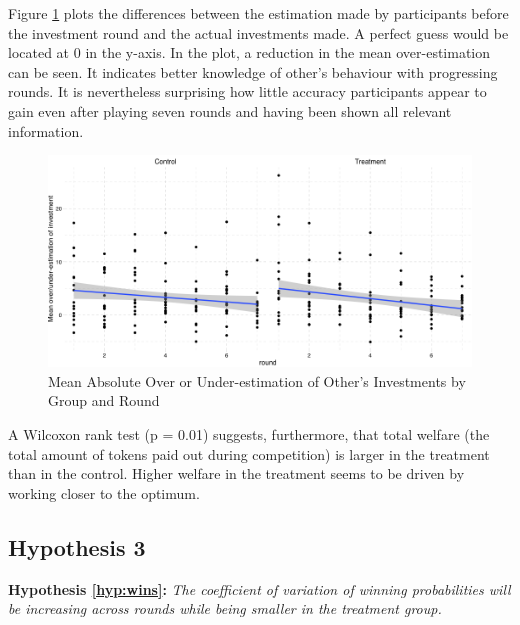 Figure \ref{fig:beliefs_smooth} plots the differences between the estimation made by participants before the investment round and the actual investments  made. A perfect guess would be located at 0 in the y-axis. In the plot, a reduction in the mean over-estimation can be seen. It indicates better knowledge of other's behaviour with progressing rounds. It is nevertheless surprising how little accuracy participants appear to gain even after playing seven rounds and having been shown all relevant information.\\

\begin{figure}
    \centering
    \includegraphics[width=\textwidth]{graphs/beliefs_smooth_lm.png}
    \caption{Mean Absolute Over or Under-estimation of Other's Investments by Group and Round}
    \label{fig:beliefs_smooth}
\end{figure}

A Wilcoxon rank test (p = 0.01) suggests, furthermore, that total welfare (the total amount of tokens paid out during competition) is larger in the treatment than in the control. Higher welfare in the treatment seems to be driven by working closer to the optimum.\\ 

\subsection{Hypothesis 3}

\textbf{Hypothesis \ref{hyp:wins}:} \textit{The coefficient of variation of winning probabilities will be increasing across rounds while being smaller in the treatment group.}\\

